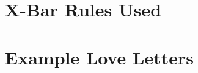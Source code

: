 \documentclass[runningheads]{llncs}
\begin{document}
\appendix
\section{X-Bar Rules Used} \label{app:xbar}

\section{Example Love Letters} \label{app:examples}



\end{document}
